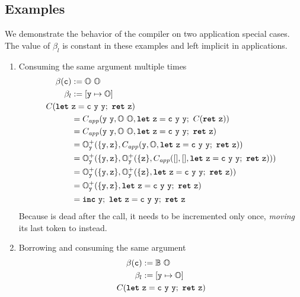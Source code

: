 \documentclass[sigconf]{acmart}
\begin{document}
\subsection*{Examples}
We demonstrate the behavior of the compiler on two application special cases.
The value of $\beta_l$ is constant in these examples and left implicit in applications.
\begin{enumerate}
\item Consuming the same argument multiple times
  \begin{align*}
    \beta(\var{c}) &:= \own{}\ \own{}\ \\
    \beta_l &:= [\var{y} \mapsto \own{}] \\
    C(\kw{let}\ &\var{z} = \var{c}\ \var{y}\ \var{y};\ \kw{ret}\ \var{z}) \\
             &= C_{\textit{app}}(\var{y}\ \var{y}, \own{}\ \own{}, \kw{let}\ \var{z} = \var{c}\ \var{y}\ \var{y};\ C(\kw{ret}\ \var{z})) \\
             &= C_{\textit{app}}(\var{y}\ \var{y}, \own{}\ \own{}, \kw{let}\ \var{z} = \var{c}\ \var{y}\ \var{y};\ \kw{ret}\ \var{z}) \\
             &= \own{}^+_\var{y}(\{\var{y}, \var{z}\}, C_{\textit{app}}(\var{y}, \own{}, \kw{let}\ \var{z} = \var{c}\ \var{y}\ \var{y};\ \kw{ret}\ \var{z})) \\
             &= \own{}^+_\var{y}(\{\var{y}, \var{z}\}, \own{}^+_\var{y}(\{\var{z}\}, C_{\textit{app}}([], [], \kw{let}\ \var{z} = \var{c}\ \var{y}\ \var{y};\ \kw{ret}\ \var{z}))) \\
             &= \own{}^+_\var{y}(\{\var{y}, \var{z}\}, \own{}^+_\var{y}(\{\var{z}\}, \kw{let}\ \var{z} = \var{c}\ \var{y}\ \var{y};\ \kw{ret}\ \var{z})) \\
             &= \own{}^+_\var{y}(\{\var{y}, \var{z}\}, \kw{let}\ \var{z} = \var{c}\ \var{y}\ \var{y};\ \kw{ret}\ \var{z}) \\
             &= \kw{inc}\ \var{y};\ \kw{let}\ \var{z} = \var{c}\ \var{y}\ \var{y};\ \kw{ret}\ \var{z}
  \end{align*}
  Because  is dead after the call, it needs to be incremented only once,
  \emph{moving} its last token to  instead.
  \item Borrowing and consuming the same argument
  \begin{align*}
    \beta(\var{c}) &:= \bor{}\ \own{}\ \\
    \beta_l &:= [\var{y} \mapsto \own{}] \\
    C(\kw{let}\ &\var{z} = \var{c}\ \var{y}\ \var{y};\ \kw{ret}\ \var{z}) \\

\end{align*}
\end{enumerate}
\end{document}
